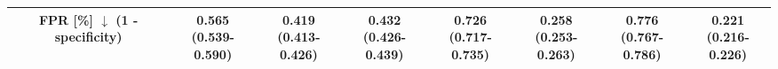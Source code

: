 \begin{frame}
\begin{table}
{\begin{tabular}{c|c|cc|cc|cc}
            \midrule
            \makecell[l]{FPR [\%] $\downarrow$ \\ (1 - specificity)} & \makecell[c]{0.565 \\ (0.539-0.590)} & \makecell[c]{0.419 \\ (0.413-0.426)} & \makecell[c]{0.432 \\ (0.426-0.439)} & \makecell[c]{0.726 \\ (0.717-0.735)} & \makecell[c]{0.258 \\ (0.253-0.263)} & \makecell[c]{0.776 \\ (0.767-0.786)} & \makecell[c]{0.221 \\ (0.216-0.226)} \\
    
            \bottomrule
        \end{tabular}%
        }
    \end{table}

\end{frame}




